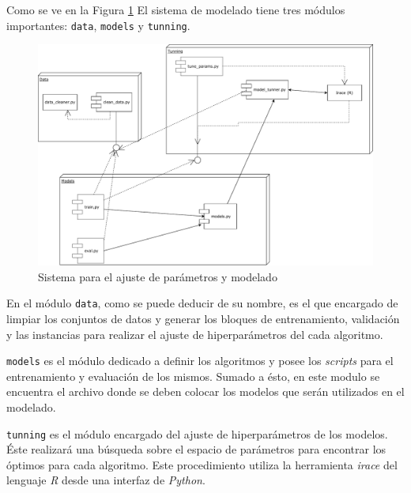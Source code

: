         \par Como se ve en la Figura \ref{fig:sistema_modelado} El sistema de
          modelado tiene tres módulos importantes: \verb|data|, \verb|models| y \verb|tunning|.

          \begin{figure}[hbt]
          \centering%
          \includegraphics[width=1\textwidth]{images/sistema_modeling_mosquitos}%
          \caption{Sistema para el ajuste de parámetros y modelado}\label{fig:sistema_modelado}
          \end{figure}

        \par En el módulo \verb|data|, como se puede deducir de su nombre,
          es el que encargado de limpiar los conjuntos de datos y generar los
          bloques de entrenamiento, validación y las instancias para realizar
          el ajuste de hiperparámetros del cada algoritmo.

        \par \verb|models| es el módulo dedicado a definir los algoritmos y
          posee los \textit{scripts} para el entrenamiento y
          evaluación de los mismos. Sumado a ésto, en este modulo se encuentra
          el archivo donde se deben colocar los modelos que serán utilizados
          en el modelado.

        \par \verb|tunning| es el módulo encargado del ajuste de hiperparámetros
          de los modelos. Éste realizará una búsqueda sobre el espacio de
          parámetros para encontrar los óptimos para cada algoritmo. Este
          procedimiento utiliza la herramienta \textit{irace} del lenguaje
          \textit{R} desde una interfaz de \textit{Python}.

